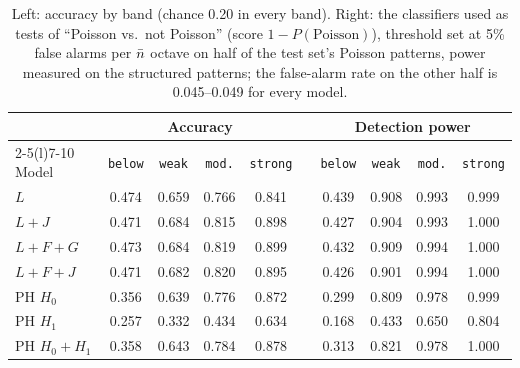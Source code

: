 \begin{table}[H]
\centering\footnotesize\setlength{\tabcolsep}{4pt}
\begin{tabular}{@{}l cccc c cccc@{}}
\toprule
 & \multicolumn{4}{c}{Accuracy} & & \multicolumn{4}{c}{Detection power}\\
\cmidrule(lr){2-5}\cmidrule(l){7-10}
Model & \texttt{below} & \texttt{weak} & \texttt{mod.} & \texttt{strong} & & \texttt{below} & \texttt{weak} & \texttt{mod.} & \texttt{strong}\\
\midrule
$L$ & 0.474 & 0.659 & 0.766 & 0.841 & & 0.439 & 0.908 & 0.993 & 0.999\\
$L{+}J$ & 0.471 & 0.684 & 0.815 & 0.898 & & 0.427 & 0.904 & 0.993 & 1.000\\
$L{+}F{+}G$ & 0.473 & 0.684 & 0.819 & 0.899 & & 0.432 & 0.909 & 0.994 & 1.000\\
$L{+}F{+}J$ & 0.471 & 0.682 & 0.820 & 0.895 & & 0.426 & 0.901 & 0.994 & 1.000\\
\midrule
PH $H_0$ & 0.356 & 0.639 & 0.776 & 0.872 & & 0.299 & 0.809 & 0.978 & 0.999\\
PH $H_1$ & 0.257 & 0.332 & 0.434 & 0.634 & & 0.168 & 0.433 & 0.650 & 0.804\\
PH $H_0{+}H_1$ & 0.358 & 0.643 & 0.784 & 0.878 & & 0.313 & 0.821 & 0.978 & 1.000\\
\bottomrule
\end{tabular}
\caption{Left: accuracy by band (chance 0.20 in every band). Right: the classifiers used as tests of ``Poisson vs.\ not Poisson'' (score $1-P(\text{Poisson})$), threshold set at 5\% false alarms per $\bar n$ octave on half of the test set's Poisson patterns, power measured on the structured patterns; the false-alarm rate on the other half is 0.045--0.049 for every model.}
\label{tab:classify-delta}
\end{table}
